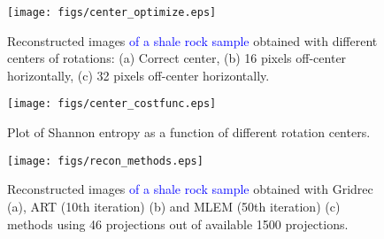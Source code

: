 \documentclass[pdf]{iucr}              %
\begin{document}
\begin{figure}
\centering
\texttt{[image: figs/center\_optimize.eps]}
\caption{Reconstructed images \textcolor{blue}{of a shale rock sample} obtained with different centers of rotations: (a) Correct center, (b) 16 pixels  off-center horizontally, (c) 32 pixels off-center horizontally.}
\label{OptimizeCenter1}
\end{figure}

\begin{figure}
\centering
\texttt{[image: figs/center\_costfunc.eps]}
\caption{Plot of Shannon entropy as a function of different rotation centers. }
\label{fig:OptimizeCenter2}
\end{figure}


\begin{figure}
\centering
\texttt{[image: figs/recon\_methods.eps]}
\caption{Reconstructed images \textcolor{blue}{of a shale rock sample} obtained with Gridrec (a), ART (10th iteration) (b) and MLEM (50th iteration) (c) methods using 46 projections out of available 1500 projections.}
\label{recon_methods}
\end{figure}
\end{document}
